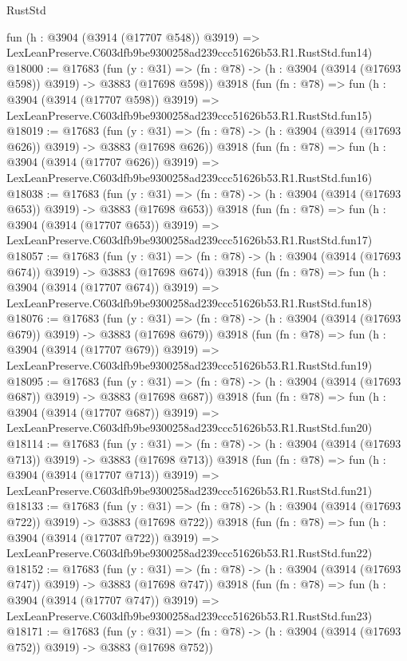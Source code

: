 \begin{lexlean}{RustStd}
\begin{coremodule}
    fun (h : @3904 (@3914 (@17707 @548)) @3919) =>
    LexLeanPreserve.C603dfb9be9300258ad239ccc51626b53.R1.RustStd.fun14)
@18000 := @17683
    (fun (y : @31) => (fn : @78) -> (h : @3904 (@3914 (@17693 @598)) @3919) -> @3883 (@17698 @598))
    @3918
    (fun (fn : @78) =>
    fun (h : @3904 (@3914 (@17707 @598)) @3919) =>
    LexLeanPreserve.C603dfb9be9300258ad239ccc51626b53.R1.RustStd.fun15)
@18019 := @17683
    (fun (y : @31) => (fn : @78) -> (h : @3904 (@3914 (@17693 @626)) @3919) -> @3883 (@17698 @626))
    @3918
    (fun (fn : @78) =>
    fun (h : @3904 (@3914 (@17707 @626)) @3919) =>
    LexLeanPreserve.C603dfb9be9300258ad239ccc51626b53.R1.RustStd.fun16)
@18038 := @17683
    (fun (y : @31) => (fn : @78) -> (h : @3904 (@3914 (@17693 @653)) @3919) -> @3883 (@17698 @653))
    @3918
    (fun (fn : @78) =>
    fun (h : @3904 (@3914 (@17707 @653)) @3919) =>
    LexLeanPreserve.C603dfb9be9300258ad239ccc51626b53.R1.RustStd.fun17)
@18057 := @17683
    (fun (y : @31) => (fn : @78) -> (h : @3904 (@3914 (@17693 @674)) @3919) -> @3883 (@17698 @674))
    @3918
    (fun (fn : @78) =>
    fun (h : @3904 (@3914 (@17707 @674)) @3919) =>
    LexLeanPreserve.C603dfb9be9300258ad239ccc51626b53.R1.RustStd.fun18)
@18076 := @17683
    (fun (y : @31) => (fn : @78) -> (h : @3904 (@3914 (@17693 @679)) @3919) -> @3883 (@17698 @679))
    @3918
    (fun (fn : @78) =>
    fun (h : @3904 (@3914 (@17707 @679)) @3919) =>
    LexLeanPreserve.C603dfb9be9300258ad239ccc51626b53.R1.RustStd.fun19)
@18095 := @17683
    (fun (y : @31) => (fn : @78) -> (h : @3904 (@3914 (@17693 @687)) @3919) -> @3883 (@17698 @687))
    @3918
    (fun (fn : @78) =>
    fun (h : @3904 (@3914 (@17707 @687)) @3919) =>
    LexLeanPreserve.C603dfb9be9300258ad239ccc51626b53.R1.RustStd.fun20)
@18114 := @17683
    (fun (y : @31) => (fn : @78) -> (h : @3904 (@3914 (@17693 @713)) @3919) -> @3883 (@17698 @713))
    @3918
    (fun (fn : @78) =>
    fun (h : @3904 (@3914 (@17707 @713)) @3919) =>
    LexLeanPreserve.C603dfb9be9300258ad239ccc51626b53.R1.RustStd.fun21)
@18133 := @17683
    (fun (y : @31) => (fn : @78) -> (h : @3904 (@3914 (@17693 @722)) @3919) -> @3883 (@17698 @722))
    @3918
    (fun (fn : @78) =>
    fun (h : @3904 (@3914 (@17707 @722)) @3919) =>
    LexLeanPreserve.C603dfb9be9300258ad239ccc51626b53.R1.RustStd.fun22)
@18152 := @17683
    (fun (y : @31) => (fn : @78) -> (h : @3904 (@3914 (@17693 @747)) @3919) -> @3883 (@17698 @747))
    @3918
    (fun (fn : @78) =>
    fun (h : @3904 (@3914 (@17707 @747)) @3919) =>
    LexLeanPreserve.C603dfb9be9300258ad239ccc51626b53.R1.RustStd.fun23)
@18171 := @17683
    (fun (y : @31) => (fn : @78) -> (h : @3904 (@3914 (@17693 @752)) @3919) -> @3883 (@17698 @752))

\end{coremodule}
\end{lexlean}
